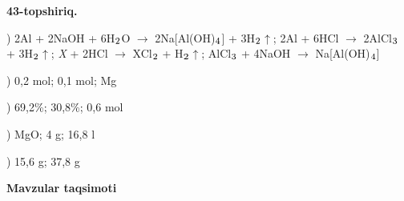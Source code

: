 \documentclass[11pt,a4paper]{article}
\renewcommand{\textsubscript}[1]{\ensuremath{_{\text{\fontsize{8}{8}\selectfont #1}}}}
\begin{document}
\noindent\textbf{43-topshiriq.}\par
{}) 2Al + 2NaOH + 6H\textsubscript{2}O $\to$ 2Na[Al(OH)\textsubscript{4}] + 3H\textsubscript{2}$\uparrow$; 2Al + 6HCl $\to$ 2AlCl\textsubscript{3} + 3H\textsubscript{2}$\uparrow$; \textit{X} + 2HCl $\to$ XCl\textsubscript{2} + H\textsubscript{2}$\uparrow$; AlCl\textsubscript{3} + 4NaOH $\to$ Na[Al(OH)\textsubscript{4}]\par
{}) 0,2 mol; 0,1 mol; Mg\par
{}) 69,2\%; 30,8\%; 0,6 mol\par
{}) MgO; 4 g; 16,8 l\par
{}) 15,6 g; 37,8 g\par
\par\bigskip\noindent\textbf{Mavzular taqsimoti}\par\smallskip
\end{document}
